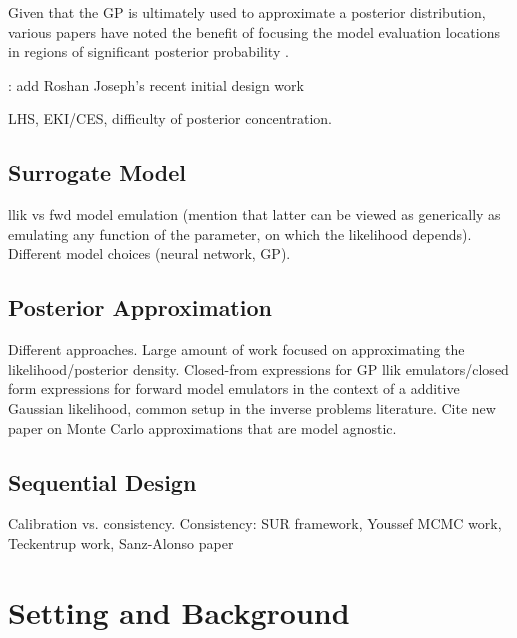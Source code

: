 \documentclass[12pt]{article}
\begin{document}
Given that the GP is ultimately used to approximate a posterior distribution, various papers have noted the benefit of 
focusing the model evaluation locations in regions of significant posterior probability 
\citep{CES,idealizedGCM}.

\todo: add Roshan Joseph's recent initial design work

LHS, EKI/CES, difficulty of posterior concentration.

\subsection{Surrogate Model}
llik vs fwd model emulation (mention that latter can be viewed as generically as emulating any function of the parameter, on 
which the likelihood depends). Different model choices (neural network, GP). 

\subsection{Posterior Approximation}
Different approaches. Large amount of work focused on approximating the likelihood/posterior density. Closed-from expressions for 
GP llik emulators/closed form expressions for forward model emulators in the context of a additive Gaussian likelihood, common setup
in the inverse problems literature. Cite new paper on Monte Carlo approximations that are model agnostic.

\subsection{Sequential Design}
Calibration vs. consistency. Consistency: SUR framework, Youssef MCMC work, Teckentrup work, Sanz-Alonso paper

\section{Setting and Background}
\end{document}
